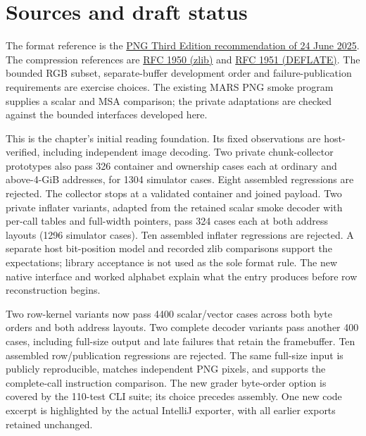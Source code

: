 \section{Sources and draft status}
The format reference is the
\href{https://www.w3.org/TR/2025/REC-png-3-20250624/}{PNG Third Edition recommendation
of 24 June 2025}. The compression references are
\href{https://www.rfc-editor.org/rfc/rfc1950.html}{RFC 1950 (zlib)} and
\href{https://www.rfc-editor.org/rfc/rfc1951.html}{RFC 1951 (DEFLATE)}.
The bounded RGB subset, separate-buffer development order and failure-publication
requirements are exercise choices. The existing MARS PNG smoke program supplies a
scalar and MSA comparison; the private adaptations are checked against the bounded
interfaces developed here.

This is the chapter's initial reading foundation. Its fixed observations are
host-verified, including independent image decoding. Two private chunk-collector
prototypes also pass 326 container and ownership cases each at ordinary and above-4-GiB
addresses, for 1304 simulator cases. Eight assembled regressions are rejected. The
collector stops at a validated container and joined payload. Two private inflater
variants, adapted from the retained scalar smoke decoder with per-call tables and
full-width pointers, pass 324 cases each at both address layouts (1296 simulator
cases). Ten assembled inflater regressions are rejected. A separate host bit-position
model and recorded zlib comparisons support the expectations; library acceptance is
not used as the sole format rule. The new native interface and worked alphabet explain
what the entry produces before row reconstruction begins.

Two row-kernel variants now pass 4400 scalar/vector cases across both byte orders
and both address layouts. Two complete decoder variants pass another 400 cases,
including full-size output and late failures that retain the framebuffer. Ten
assembled row/publication regressions are rejected. The same full-size input is
publicly reproducible, matches independent PNG pixels, and supports the complete-call
instruction comparison. The new grader byte-order option is covered by the 110-test
CLI suite; its choice precedes assembly. One new code excerpt is highlighted by the
actual IntelliJ exporter, with all earlier exports retained unchanged.


